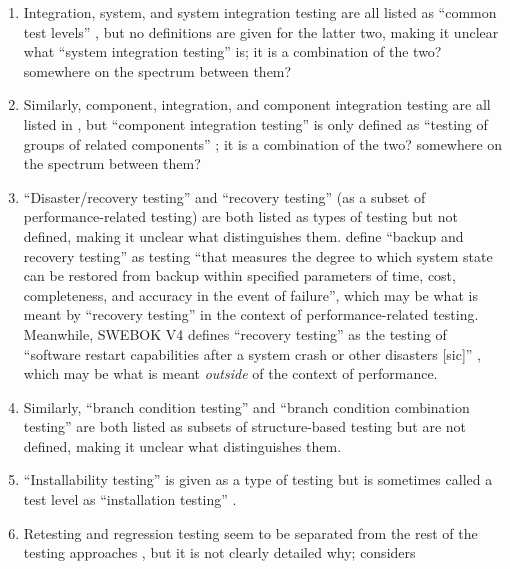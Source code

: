 \begin{enumerate}
      \item Integration, system, and system integration testing are all listed
            as ``common test levels'' \cite[p.~12]{IEEE2022}, but no
            definitions are given for the latter two, making it unclear what
            ``system integration testing'' is; it is a combination of the two?
            somewhere on the spectrum between them?
      \item Similarly, component, integration, and component integration
            testing are all listed in \citet{IEEE2017}, but ``component
            integration testing'' is only defined as ``testing of groups of
            related components'' \cite[p.~82]{IEEE2017}; it is a combination of
            the two? somewhere on the spectrum between them?
      \item ``Disaster/recovery testing'' and ``recovery testing'' (as a subset
            of performance-related testing) are both listed as types of testing
            \cite[p.~22]{IEEE2022} but not defined, making it unclear what
            distinguishes them. \citet[p.~2]{IEEE2013} define ``backup and
            recovery testing'' as  testing ``that measures the degree to which
            system state can be restored from backup within specified parameters
            of time, cost, completeness, and accuracy in the event of failure'',
            which may be what is meant by ``recovery
            testing'' in the context of performance-related testing.
            Meanwhile, SWEBOK V4 defines ``recovery testing'' as the testing of
            ``software restart capabilities after a system crash or other
            disasters [sic]'' \citep[p.~5-9]{SWEBOK2024}, which may be what is
            meant \emph{outside} of the context of performance.
      \item Similarly, ``branch condition testing'' and ``branch condition combination
            testing'' are both listed as subsets of structure-based testing
            \cite[p.~22]{IEEE2022} but are not defined, making it unclear what
            distinguishes them.
      \item ``Installability testing'' is given as a type of testing
            \cite[p.~22]{IEEE2022} but is sometimes called a test level as
            ``installation testing'' \cite[p.~445]{PetersAndPedrycz2000}.
      \item Retesting and regression testing seem to be separated from the rest
            of the testing approaches \cite[p.~23]{IEEE2022}, but it is not
            clearly detailed why; \citet[p.~3]{BarbosaEtAl2006} considers

\end{enumerate}
